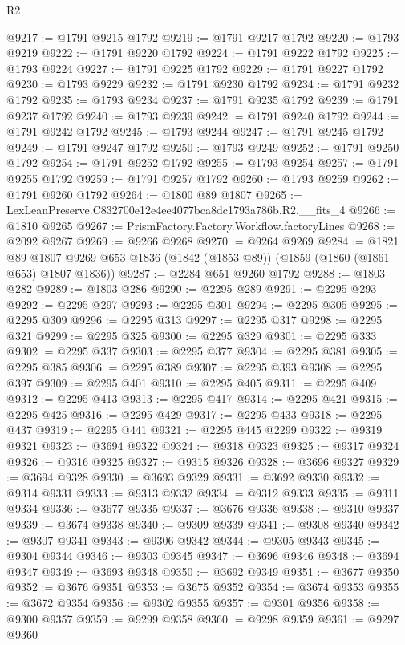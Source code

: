 \begin{lexlean}{R2}
\begin{coremodule}
@9217 := @1791 @9215 @1792
@9219 := @1791 @9217 @1792
@9220 := @1793 @9219
@9222 := @1791 @9220 @1792
@9224 := @1791 @9222 @1792
@9225 := @1793 @9224
@9227 := @1791 @9225 @1792
@9229 := @1791 @9227 @1792
@9230 := @1793 @9229
@9232 := @1791 @9230 @1792
@9234 := @1791 @9232 @1792
@9235 := @1793 @9234
@9237 := @1791 @9235 @1792
@9239 := @1791 @9237 @1792
@9240 := @1793 @9239
@9242 := @1791 @9240 @1792
@9244 := @1791 @9242 @1792
@9245 := @1793 @9244
@9247 := @1791 @9245 @1792
@9249 := @1791 @9247 @1792
@9250 := @1793 @9249
@9252 := @1791 @9250 @1792
@9254 := @1791 @9252 @1792
@9255 := @1793 @9254
@9257 := @1791 @9255 @1792
@9259 := @1791 @9257 @1792
@9260 := @1793 @9259
@9262 := @1791 @9260 @1792
@9264 := @1800 @89 @1807
@9265 := LexLeanPreserve.C832700e12e4ee4077bca8dc1793a786b.R2.__fits_4
@9266 := @1810 @9265
@9267 := PrismFactory.Factory.Workflow.factoryLines
@9268 := @2092 @9267
@9269 := @9266 @9268
@9270 := @9264 @9269
@9284 := @1821
    @89
    @1807
    @9269
    @653
    @1836
    (@1842 (@1853 @89))
    (@1859 (@1860 (@1861 @653) @1807 @1836))
@9287 := @2284 @651 @9260 @1792
@9288 := @1803 @282
@9289 := @1803 @286
@9290 := @2295 @289
@9291 := @2295 @293
@9292 := @2295 @297
@9293 := @2295 @301
@9294 := @2295 @305
@9295 := @2295 @309
@9296 := @2295 @313
@9297 := @2295 @317
@9298 := @2295 @321
@9299 := @2295 @325
@9300 := @2295 @329
@9301 := @2295 @333
@9302 := @2295 @337
@9303 := @2295 @377
@9304 := @2295 @381
@9305 := @2295 @385
@9306 := @2295 @389
@9307 := @2295 @393
@9308 := @2295 @397
@9309 := @2295 @401
@9310 := @2295 @405
@9311 := @2295 @409
@9312 := @2295 @413
@9313 := @2295 @417
@9314 := @2295 @421
@9315 := @2295 @425
@9316 := @2295 @429
@9317 := @2295 @433
@9318 := @2295 @437
@9319 := @2295 @441
@9321 := @2295 @445 @2299
@9322 := @9319 @9321
@9323 := @3694 @9322
@9324 := @9318 @9323
@9325 := @9317 @9324
@9326 := @9316 @9325
@9327 := @9315 @9326
@9328 := @3696 @9327
@9329 := @3694 @9328
@9330 := @3693 @9329
@9331 := @3692 @9330
@9332 := @9314 @9331
@9333 := @9313 @9332
@9334 := @9312 @9333
@9335 := @9311 @9334
@9336 := @3677 @9335
@9337 := @3676 @9336
@9338 := @9310 @9337
@9339 := @3674 @9338
@9340 := @9309 @9339
@9341 := @9308 @9340
@9342 := @9307 @9341
@9343 := @9306 @9342
@9344 := @9305 @9343
@9345 := @9304 @9344
@9346 := @9303 @9345
@9347 := @3696 @9346
@9348 := @3694 @9347
@9349 := @3693 @9348
@9350 := @3692 @9349
@9351 := @3677 @9350
@9352 := @3676 @9351
@9353 := @3675 @9352
@9354 := @3674 @9353
@9355 := @3672 @9354
@9356 := @9302 @9355
@9357 := @9301 @9356
@9358 := @9300 @9357
@9359 := @9299 @9358
@9360 := @9298 @9359
@9361 := @9297 @9360

\end{coremodule}
\end{lexlean}
